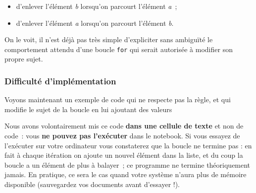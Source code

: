 \begin{itemize}
\tightlist
\item
  d'enlever l'élément \emph{b} lorsqu'on parcourt l'élément \emph{a}~;
\item
  d'enlever l'élément \emph{a} lorsqu'on parcourt l'élément \emph{b}.
\end{itemize}

On le voit, il n'est déjà pas très simple d'expliciter sans ambiguïté le
comportement attendu d'une boucle \texttt{for} qui serait autorisée à
modifier son propre sujet.

    \hypertarget{difficultuxe9-dimpluxe9mentation}{%
\subsubsection{Difficulté
d'implémentation}\label{difficultuxe9-dimpluxe9mentation}}

    Voyons maintenant un exemple de code qui ne respecte pas la règle, et
qui modifie le sujet de la boucle en lui ajoutant des valeurs

    \begin{Shaded}
\begin{Highlighting}[frame=lines,framerule=0.6mm,rulecolor=\color{asisframecolor}]
\OperatorTok{=}\NormalTok{ [}\NormalTok{, }\NormalTok{, }\NormalTok{]}
    \OperatorTok{==} \NormalTok{:}
\end{Highlighting}
\end{Shaded}

    Nous avons volontairement mis ce code \textbf{dans une cellule de texte}
et non de code~: vous \textbf{ne pouvez pas l'exécuter} dans le
notebook. Si vous essayez de l'exécuter sur votre ordinateur vous
constaterez que la boucle ne termine pas : en fait à chaque itération on
ajoute un nouvel élément dans la liste, et du coup la boucle a un
élément de plus à balayer~; ce programme ne termine théoriquement
jamais. En pratique, ce sera le cas quand votre système n'aura plus de
mémoire disponible (sauvegardez vos documents avant d'essayer !).


    
    
    

